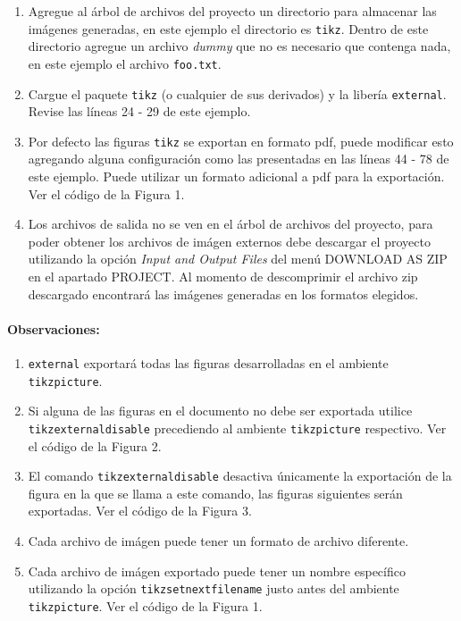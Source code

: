 \documentclass{article}
\begin{document}
\begin{enumerate}
	\item Agregue al árbol de archivos del proyecto un directorio para almacenar las imágenes generadas, en este ejemplo el directorio es \texttt{tikz}. Dentro de este directorio agregue un archivo \textit{dummy} que no es necesario que contenga nada, en este ejemplo el archivo \texttt{foo.txt}.
    \item Cargue el paquete \texttt{tikz} (o cualquier de sus derivados) y la libería \texttt{external}. Revise las líneas 24 - 29 de este ejemplo.
    \item Por defecto las figuras \texttt{tikz} se exportan en formato pdf, puede modificar esto agregando alguna configuración como las presentadas en las líneas 44 - 78 de este ejemplo. Puede utilizar un formato adicional a pdf para la exportación. Ver el código de la Figura 1.
   \item Los archivos de salida no se ven en el árbol de archivos del proyecto, para poder obtener los archivos de imágen externos debe descargar el proyecto utilizando la opción \emph{Input and Output Files} del menú DOWNLOAD AS ZIP en el apartado PROJECT. Al momento de descomprimir el archivo zip descargado encontrará las imágenes generadas en los formatos elegidos.
\end{enumerate}

\paragraph{Observaciones:}
\begin{enumerate}
	\item \texttt{external} exportará todas las figuras desarrolladas en el ambiente \texttt{tikzpicture}.
    \item Si alguna de las figuras en el documento no debe ser exportada utilice \texttt{tikzexternaldisable} precediendo al ambiente \texttt{tikzpicture} respectivo. Ver el código de la Figura 2.
    \item El comando \texttt{tikzexternaldisable} desactiva únicamente la exportación de la figura en la que se llama a este comando, las figuras siguientes serán exportadas. Ver el código de la Figura 3.
    \item Cada archivo de imágen puede tener un formato de archivo diferente.
    \item Cada archivo de imágen exportado puede tener un nombre específico utilizando la opción \texttt{tikzsetnextfilename} justo antes del ambiente \texttt{tikzpicture}. Ver el código de la Figura 1.
\end{enumerate}
\end{document}
